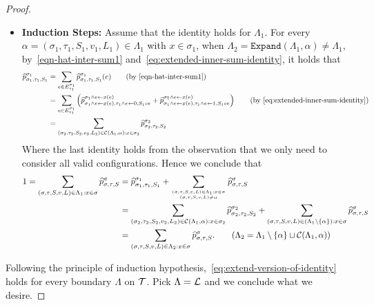\documentclass[11pt]{article}
\newcommand{\set}[1]{\left\{#1\right\}}
\def\!#1{\mathtt{#1}}
\newcommand{\wh}[1]{\widehat{#1}}
\def\Expand{\!{Expand}}
\begin{document}
\begin{proof}
\begin{itemize}
        \item \textbf{Induction Steps:} Assume that the identity holds for $\Lambda_1$. For every $\alpha = (\sigma_1, \tau_1, S_1, v_1, L_1) \in \Lambda_1$ with $x \in \sigma_1$, when $\Lambda_2 = \Expand(\Lambda_1, \alpha) \neq \Lambda_1$, by~\eqref{eqn-hat-inter-sum1} and~\eqref{eq:extended-inner-sum-identity}, it holds that
        \begin{align*}
            \wh{p}_{\sigma_1, \tau_1, S_1}^{\sigma_1} &= \sum_{e \in E_{v_1}^{\sigma_1}} \wh{p}_{\sigma_1, \tau_1, S_1}^{\sigma_1}(e) \tag{by~\eqref{eqn-hat-inter-sum1}}\\
            &= \sum_{e \in E_{v_1}^{\sigma_1}} \left(\wh{p}_{\sigma_1 \wedge e \gets x(e), \tau_1 \wedge e \gets 0, S_1 \circ e}^{\sigma_1 \wedge e \gets x(e)} + \widehat{p}_{\sigma_1 \wedge e \gets x(e), \tau_1 \wedge e \gets 1, S_1 \circ e}^{\sigma_1 \wedge e \gets x(e)}\right) \tag{by~\eqref{eq:extended-inner-sum-identity}} \\
            &= \sum_{(\sigma_2, \tau_2, S_2, v_2, L_2) \in \+C(\Lambda_1, \alpha) : x \in \sigma_2} \wh{p}_{\sigma_2, \tau_2, S_2}^{\sigma_2}
        \end{align*}
        Where the last identity holds from the observation that we only need to consider all valid configurations. Hence we conclude that
        \begin{align*}
            1 = \sum_{(\sigma, \tau, S, v, L) \in \Lambda_1 : x \in \sigma} \wh{p}_{\sigma, \tau, S}^{\sigma} &= \wh{p}_{\sigma_1, \tau_1, S_1}^{\sigma_1} + \sum_{(\sigma, \tau, S, v, L) \in \Lambda_1 : x \in \sigma \atop (\sigma, \tau, S, v, L) \neq \alpha} \wh{p}_{\sigma, \tau, S}^{\sigma} \\
            &= \sum_{(\sigma_2, \tau_2, S_2, v_2, L_2) \in \+C(\Lambda_1, \alpha) : x \in \sigma_2} \wh{p}_{\sigma_2, \tau_2, S_2}^{\sigma_2} + \sum_{(\sigma, \tau, S, v, L) \in (\Lambda_1 \setminus \set{\alpha}) : x \in \sigma} \wh{p}_{\sigma, \tau, S}^{\sigma} \\
            &= \sum_{(\sigma, \tau, S, v, L) \in \Lambda_2 : x \in \sigma} \wh{p}_{\sigma, \tau, S}^{\sigma}. \tag{$\Lambda_2 = \Lambda_1 \setminus \set{\alpha} \sqcup \+C(\Lambda_1, \alpha)$}
        \end{align*}
    \end{itemize}
    Following the principle of induction hypothesis,~\eqref{eq:extend-version-of-identity} holds for every boundary $\Lambda$ on $\mathcal{T}$. Pick $\Lambda = \mathcal{L}$ and we conclude what we desire.
    \fi
\end{proof}
\end{document}
